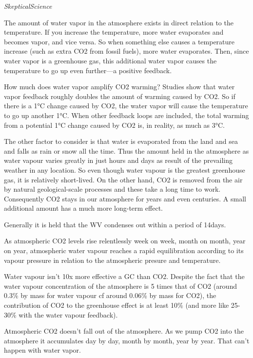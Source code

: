 \documentclass[
]{book}
\begin{document}
\emph{SkepticalScience}

The amount of water vapor in the atmosphere exists in direct relation to the temperature. If you increase the temperature, more water evaporates and becomes vapor, and vice versa. So when something else causes a temperature increase (such as extra CO2 from fossil fuels), more water evaporates. Then, since water vapor is a greenhouse gas, this additional water vapor causes the temperature to go up even further---a positive feedback.

How much does water vapor amplify CO2 warming? Studies show that water vapor feedback roughly doubles the amount of warming caused by CO2. So if there is a 1°C change caused by CO2, the water vapor will cause the temperature to go up another 1°C. When other feedback loops are included, the total warming from a potential 1°C change caused by CO2 is, in reality, as much as 3°C.

The other factor to consider is that water is evaporated from the land and sea and falls as rain or snow all the time. Thus the amount held in the atmosphere as water vapour varies greatly in just hours and days as result of the prevailing weather in any location. So even though water vapour is the greatest greenhouse gas, it is relatively short-lived. On the other hand, CO2 is removed from the air by natural geological-scale processes and these take a long time to work. Consequently CO2 stays in our atmosphere for years and even centuries. A small additional amount has a much more long-term effect.

Generally it is held that the WV condenses out within a period of 14days.

As atmospheric CO2 levels rise relentlessly week on week, month on month, year on year, atmospheric water vapour reaches a rapid equilibration according to its vapour pressure in relation to the atmospheric presure and temperature.

Water vapour isn't 10x more effective a GC than CO2. Despite the fact that the water vapour concentration of the atmosphere is 5 times that of CO2 (around 0.3\% by mass for water vapour cf around 0.06\% by mass for CO2), the contribution of CO2 to the greenhouse effect is at least 10\% (and more like 25-30\% with the water vapour feedback).

Atmospheric CO2 doesn't fall out of the atmosphere. As we pump CO2 into the atmosphere it accumulates day by day, month by month, year by year. That can't happen with water vapor.
\end{document}
